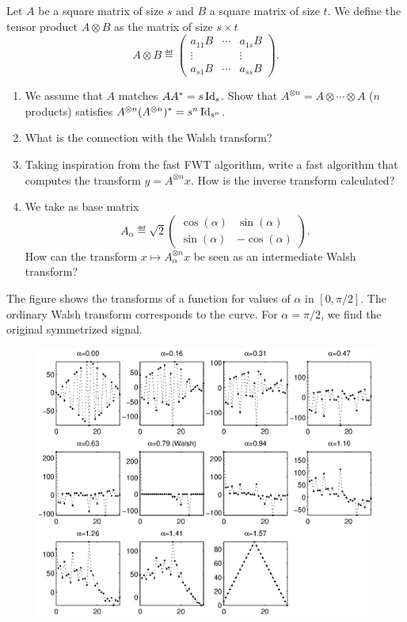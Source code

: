  
\begin{exo}
\label{exo-tensor-product}
 Let $ A $ be a square matrix of size $ s $ and $ B $ a square matrix of size $ t $. We define the tensor product $ A \otimes B $ as the matrix of size $ s \times t $
\begin{equation*}
A \otimes B \eqdef \begin{pmatrix} a_{11} B & \cdots & a_{1s} B \\\vdots & & \vdots \\a_{s1} B & \cdots & a_{ss} B \end{pmatrix}.
\end{equation*}
\begin{enumerate}
\item We assume that $ A $ matches $ AA^* = s \operatorname{Id}_s $. Show that $ A^{\otimes n} = A \otimes \cdots \otimes A $ ($ n $ products) satisfies $ A^{\otimes n} (A^{\otimes n})^* = s^n \operatorname{Id}_{s^n} $.
\item What is the connection with the Walsh transform?
\item Taking inspiration from the fast FWT algorithm, write a fast algorithm that computes the transform $ y = A^{\otimes n} x $. How is the inverse transform calculated?
\item We take as base matrix
\begin{equation*}
A_\alpha \eqdef \sqrt{2} \begin{pmatrix} \cos (\alpha) & \sin (\alpha) \\\sin (\alpha) & - \cos (\alpha) \end{pmatrix}.
\end{equation*}
How can the transform $ x \mapsto A_\alpha^{\otimes n} x $ be seen as an intermediate Walsh transform?
\end{enumerate} The figure  shows the transforms of a  function for values of $ \alpha $ in $ [0, \pi / 2] $. The ordinary Walsh transform corresponds to the  curve. For $ \alpha = \pi / 2 $, we find the original symmetrized signal. \begin{figure}[ht]
    \begin{center}
    \includegraphics [scale = 0.7]{images/transfo-walsh-interm.eps}

\end{center}
\end{figure}
\end{exo}
